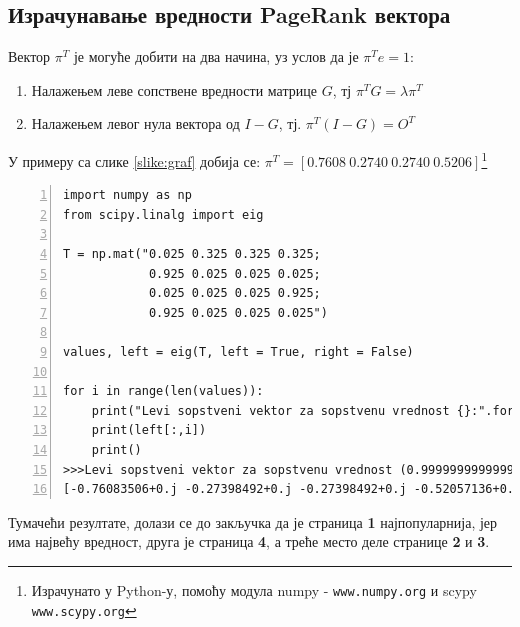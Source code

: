        \subsection{Израчунавање вредности PageRank\texttrademark{} вектора}
       Вектор $\pi^{T}$ је могуће добити на два начина, уз услов да је $\pi^{T}e = 1$:
       \begin{enumerate}
       \item Налажењем леве сопствене вредности матрице $G$, тј $\pi^{T}G=\lambda \pi^{T}$
       \item Налажењем левог нула вектора од $I - G$, тј. $\pi^{T}(I-G)=O^{T}$
       \end{enumerate}
       У примеру са слике \ref{slike:graf} добија се: $\pi^{T} = \left [0.7608\: 0.2740\: 0.2740\: 0.5206 \right ]$\footnote{Израчунато у Python-у, помоћу модула numpy - \texttt{www.numpy.org} и scypy \texttt{www.scypy.org}} 
       \begin{lstlisting}[caption=Израчунавање леве сопствене вредности, label={lst:eigen}, numbers=left]
import numpy as np
from scipy.linalg import eig

T = np.mat("0.025 0.325 0.325 0.325;
            0.925 0.025 0.025 0.025; 
            0.025 0.025 0.025 0.925; 
            0.925 0.025 0.025 0.025")
            
values, left = eig(T, left = True, right = False)

for i in range(len(values)):
	print("Levi sopstveni vektor za sopstvenu vrednost {}:".format(values[i]))
	print(left[:,i])
	print()
>>>Levi sopstveni vektor za sopstvenu vrednost (0.9999999999999998+0j):
[-0.76083506+0.j -0.27398492+0.j -0.27398492+0.j -0.52057136+0.j]
        \end{lstlisting}
        Тумачећи резултате, долази се до закључка да је страница \textbf{1} најпопуларнија, јер има највећу вредност, друга је страница \textbf{4}, а треће место деле странице \textbf{2} и \textbf{3}.
\pagebreak		

